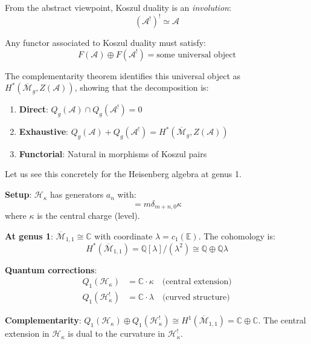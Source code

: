 \begin{motivation}
From the abstract viewpoint, Koszul duality is an \emph{involution}:
\begin{equation}
(\mathcal{A}^!)^! \simeq \mathcal{A}
\end{equation}

Any functor associated to Koszul duality must satisfy:
\begin{equation}
F(\mathcal{A}) \oplus F(\mathcal{A}^!) = \text{some universal object}
\end{equation}

The complementarity theorem identifies this universal object as 
$H^*(\overline{\mathcal{M}}_g, Z(\mathcal{A}))$, showing that the decomposition is:
\begin{enumerate}
\item \textbf{Direct}: $Q_g(\mathcal{A}) \cap Q_g(\mathcal{A}^!) = 0$
\item \textbf{Exhaustive}: $Q_g(\mathcal{A}) + Q_g(\mathcal{A}^!) = 
H^*(\overline{\mathcal{M}}_g, Z(\mathcal{A}))$
\item \textbf{Functorial}: Natural in morphisms of Koszul pairs
\end{enumerate}
\end{motivation}

\begin{motivation}
Let us see this concretely for the Heisenberg algebra at genus 1.

\textbf{Setup}: $\mathcal{H}_\kappa$ has generators $a_n$ with:
\begin{equation}
[a_m, a_n] = m\delta_{m+n,0} \kappa
\end{equation}
where $\kappa$ is the central charge (level).

\textbf{At genus 1}: $\overline{\mathcal{M}}_{1,1} \cong \mathbb{C}$ with coordinate 
$\lambda = c_1(\mathbb{E})$. The cohomology is:
\begin{equation}
H^*(\overline{\mathcal{M}}_{1,1}) = \mathbb{Q}[\lambda] / (\lambda^2) 
\cong \mathbb{Q} \oplus \mathbb{Q}\lambda
\end{equation}

\textbf{Quantum corrections}:
\begin{align}
Q_1(\mathcal{H}_\kappa) &= \mathbb{C} \cdot \kappa \quad \text{(central extension)}\\
Q_1(\mathcal{H}_\kappa^!) &= \mathbb{C} \cdot \lambda \quad \text{(curved structure)}
\end{align}

\textbf{Complementarity}: $Q_1(\mathcal{H}_\kappa) \oplus Q_1(\mathcal{H}_\kappa^!) 
\cong H^1(\overline{\mathcal{M}}_{1,1}) = \mathbb{C} \oplus \mathbb{C}$. The central 
extension in $\mathcal{H}_\kappa$ is dual to the curvature in $\mathcal{H}_\kappa^!$.
\end{motivation}

